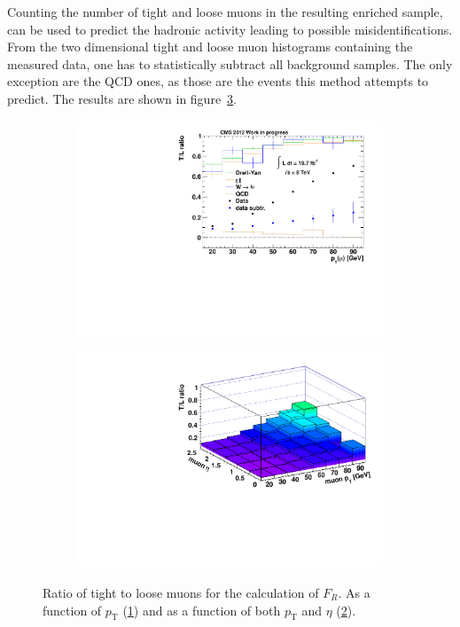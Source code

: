 Counting the number of tight and loose muons in the resulting enriched sample, can be used to predict the hadronic activity leading to possible misidentifications. From the two dimensional tight and loose muon histograms containing the measured data, one has to statistically subtract all background samples. The only exception are the QCD ones, as those are the events this method attempts to predict. The results are shown in figure~\ref{fig:tlratios}.
 
\begin{figure}[!htbp]
  \centering
  \begin{subfigure}[b]{0.495\textwidth}
    \centering
    \includegraphics[width=\textwidth]{plots/tlratio.pdf}
    \caption{\label{fig:tlratio}}
  \end{subfigure}
  \begin{subfigure}[b]{0.495\textwidth}
    \centering
    \includegraphics[width=\textwidth]{plots/tlratio2d.pdf}
    \caption{\label{fig:tlratio2d}}
  \end{subfigure}

  \caption{Ratio of tight to loose muons for the calculation of $F_R$. As a function of $p_{\text{T}}$ (\ref{fig:tlratio}) and as a function of both $p_{\text{T}}$ and $\eta$ (\ref{fig:tlratio2d}).}
  \label{fig:tlratios}
\end{figure}

